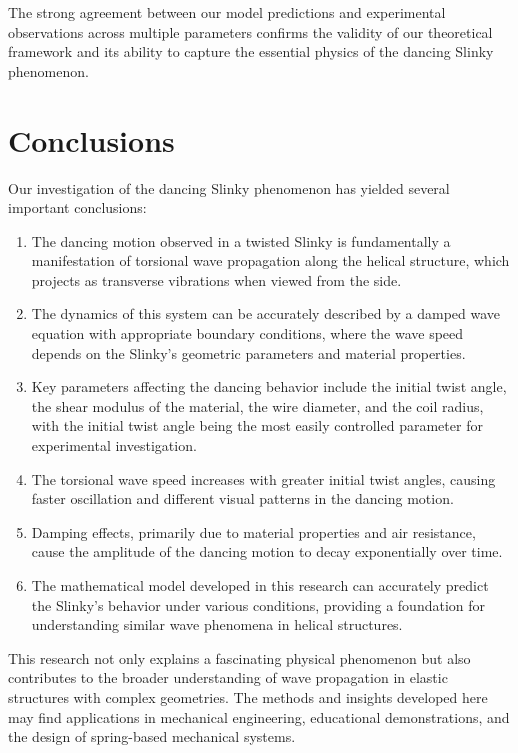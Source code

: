 \documentclass{mcmthesis}  %
\begin{document}
The strong agreement between our model predictions and experimental observations across multiple parameters confirms the validity of our theoretical framework and its ability to capture the essential physics of the dancing Slinky phenomenon.

\section{Conclusions}  %

Our investigation of the dancing Slinky phenomenon has yielded several important conclusions:

\begin{enumerate}
    \item The dancing motion observed in a twisted Slinky is fundamentally a manifestation of torsional wave propagation along the helical structure, which projects as transverse vibrations when viewed from the side.
    
    \item The dynamics of this system can be accurately described by a damped wave equation with appropriate boundary conditions, where the wave speed depends on the Slinky's geometric parameters and material properties.
    
    \item Key parameters affecting the dancing behavior include the initial twist angle, the shear modulus of the material, the wire diameter, and the coil radius, with the initial twist angle being the most easily controlled parameter for experimental investigation.
    
    \item The torsional wave speed increases with greater initial twist angles, causing faster oscillation and different visual patterns in the dancing motion.
    
    \item Damping effects, primarily due to material properties and air resistance, cause the amplitude of the dancing motion to decay exponentially over time.
    
    \item The mathematical model developed in this research can accurately predict the Slinky's behavior under various conditions, providing a foundation for understanding similar wave phenomena in helical structures.
\end{enumerate}

This research not only explains a fascinating physical phenomenon but also contributes to the broader understanding of wave propagation in elastic structures with complex geometries. The methods and insights developed here may find applications in mechanical engineering, educational demonstrations, and the design of spring-based mechanical systems.
\end{document}
